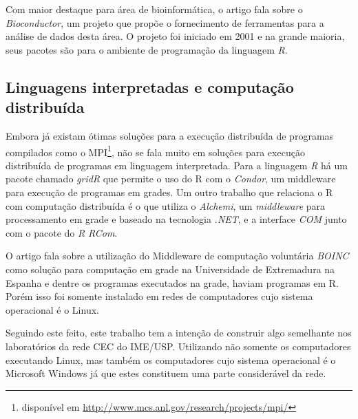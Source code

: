 Com maior destaque para área de bioinformática, o artigo 
\cite{bioconductor} fala sobre o \emph{Bioconductor}, um projeto  que propõe o fornecimento 
de ferramentas para a análise de dados desta área. O projeto foi iniciado em 2001 e na grande maioria, 
seus pacotes são para o ambiente de programação da linguagem \emph{R}.

\subsection{Linguagens interpretadas e computação distribuída}

Embora já existam ótimas soluções para a execução distribuída de programas compilados como o
 MPI\footnote{disponível em \url{http://www.mcs.anl.gov/research/projects/mpi/}}, não se fala muito em soluções 
para execução distribuída de programas em linguagem interpretada. 
Para a linguagem \emph{R} há um pacote chamado \emph{gridR} que permite o uso do R com o \emph{Condor}, %
um middleware para execução de programas em grades.  
Um outro trabalho que relaciona o R com computação distribuída é o \cite{Dias} que 
utiliza o \emph{Alchemi}, um \textit{middleware} para processamento em grade e baseado na 
tecnologia \textit{.NET}, e a interface \textit{COM} junto com o pacote do \emph{R}
\emph{RCom}.  


O artigo \cite{boinc} fala sobre a utilização do Middleware de computação voluntária \emph{BOINC} como solução para computação 
em grade na Universidade de Extremadura na Espanha e dentre os programas executados na grade, haviam
programas em R. Porém isso foi somente instalado em redes de computadores cujo sistema
operacional é o Linux. 

Seguindo este feito, este trabalho tem a intenção de construir algo semelhante nos laboratórios da rede CEC do IME/USP. Utilizando
não somente os computadores executando Linux, mas também os computadores cujo sistema operacional é o Microsoft Windows %
já que estes constituem uma parte considerável da rede.  





